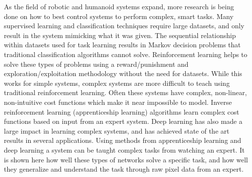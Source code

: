 \documentclass[12pt,american]{report}
\begin{document}
\begin{abstractpage}
As the field of robotic and humanoid systems expand, more research is being done on how to best control systems to perform complex, smart tasks. Many supervised learning and classification techniques require large datasets, and only result in the system mimicking what it was given. The sequential relationship within datasets used for task learning results in Markov decision problems that traditional classification algorithms cannot solve. Reinforcement learning helps to solve these types of problems using a reward/punishment and exploration/exploitation methodology without the need for datasets. While this works for simple systems, complex systems are more difficult to teach using traditional reinforcement learning. Often these systems have complex, non-linear, non-intuitive cost functions which make it near impossible to model.  Inverse reinforcement learning (apprenticeship learning) algorithms learn complex cost functions based on input from an expert system. Deep learning has also made a large impact in learning complex systems, and has achieved state of the art results in several applications.  Using methods from apprenticeship learning and deep learning a system can be taught complex tasks from watching an expert.  It is shown here how well these types of networks solve a specific task, and how well they generalize and understand the task through raw pixel data from an expert.
\end{abstractpage}



\afterpreface%


\body%
\end{document}
